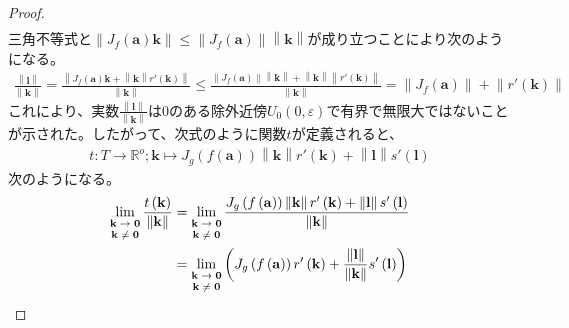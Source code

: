 \documentclass[dvipdfmx]{jsarticle}
\begin{document}
\begin{proof}
\begin{align*}
\end{align*}
三角不等式と$\left\| J_{f}\left( \mathbf{a} \right)\mathbf{k} \right\| \leq \left\| J_{f}\left( \mathbf{a} \right) \right\|\left\| \mathbf{k} \right\|$が成り立つことにより次のようになる。
\begin{align*}
\frac{\left\| \mathbf{l} \right\|}{\left\| \mathbf{k} \right\|} = \frac{\left\| J_{f}\left( \mathbf{a} \right)\mathbf{k} + \left\| \mathbf{k} \right\| r'\left( \mathbf{k} \right) \right\|}{\left\| \mathbf{k} \right\|} \leq \frac{\left\| J_{f}\left( \mathbf{a} \right) \right\|\left\| \mathbf{k} \right\| + \left\| \mathbf{k} \right\|\left\| r'\left( \mathbf{k} \right) \right\|}{\left\| \mathbf{k} \right\|} = \left\| J_{f}\left( \mathbf{a} \right) \right\| + \left\| r'\left( \mathbf{k} \right) \right\|
\end{align*}
これにより、実数$\frac{\left\| \mathbf{l} \right\|}{\left\| \mathbf{k} \right\|}$は$0$のある除外近傍$U_{0}(0,\varepsilon)$で有界で無限大ではないことが示された。したがって、次式のように関数$t$が定義されると、
\begin{align*}
t:T \rightarrow \mathbb{R}^{o};\mathbf{k} \mapsto J_{g}\left( f\left( \mathbf{a} \right) \right)\left\| \mathbf{k} \right\| r'\left( \mathbf{k} \right) + \left\| \mathbf{l} \right\| s'\left( \mathbf{l} \right)
\end{align*}
次のようになる。
\begin{align*}
\lim_{\scriptsize \begin{matrix}
\mathbf{k} \rightarrow \mathbf{0} \\
\mathbf{k} \neq \mathbf{0} \\
\end{matrix}}\frac{t\left( \mathbf{k} \right)}{\left\| \mathbf{k} \right\|} &= \lim_{\scriptsize \begin{matrix}
\mathbf{k} \rightarrow \mathbf{0} \\
\mathbf{k} \neq \mathbf{0} \\
\end{matrix}}\frac{J_{g}\left( f\left( \mathbf{a} \right) \right)\left\| \mathbf{k} \right\| r'\left( \mathbf{k} \right) + \left\| \mathbf{l} \right\| s'\left( \mathbf{l} \right)}{\left\| \mathbf{k} \right\|}\\
&= \lim_{\scriptsize \begin{matrix}
\mathbf{k} \rightarrow \mathbf{0} \\
\mathbf{k} \neq \mathbf{0} \\
\end{matrix}}\left( J_{g}\left( f\left( \mathbf{a} \right) \right)r'\left( \mathbf{k} \right) + \frac{\left\| \mathbf{l} \right\|}{\left\| \mathbf{k} \right\|}s'\left( \mathbf{l} \right) \right)\\

\end{align*}
\end{proof}
\end{document}
